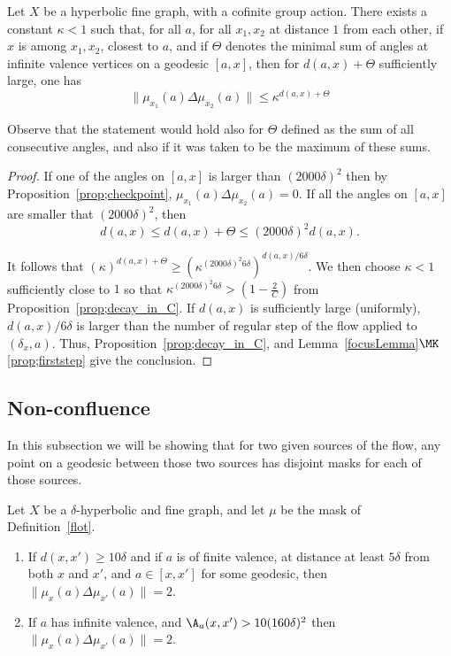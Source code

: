 \begin{prop}\label{prop;kappa}
Let $X$ be a hyperbolic fine graph, with a cofinite group
action. There exists a constant $\kappa <1$ such that, for all $a$, for all $x_1, x_2$ at distance $1$ from each other, if $x$ is among $x_1,x_2$, closest to $a$, and if $\Theta$ denotes the minimal sum of angles at infinite valence vertices on a geodesic $[a,x]$, then for $d(a,x)+\Theta $ sufficiently large, one has
\[
\| \mu_{x_1}(a) \Delta \mu_{x_2}(a) \| \leq \kappa^{d(a,x)+\Theta}
\]
\end{prop}

Observe that the statement would hold also for $\Theta$ defined as the sum of all consecutive angles, and also if it was taken to be the maximum of these sums.

\begin{proof}
If one of the angles on $[a,x]$ is larger than $(2000\delta)^2$ then by Proposition~\ref{prop;checkpoint}, $\mu_{x_1}(a) \Delta \mu_{x_2}(a) =0$. If all the angles on $[a,x]$ are smaller that $(2000\delta)^2$,
then
\[
d(a,x) \leq d(a,x)+\Theta \leq (2000\delta)^2 d(a,x).
\]

It follows that $(\kappa)^{d(a,x)+\Theta} \geq (\kappa^{(2000\delta)^2 6\delta })^{d(a,x)/6\delta}$. We then choose $\kappa<1$ sufficiently close to $1$ so that $\kappa^{(2000\delta)^2 6\delta } > (1-\frac{2}{C})$ from Proposition~\ref{prop;decay_in_C}. If $d(a,x)$ is sufficiently large (uniformly), $d(a,x)/6\delta$ is larger than the number of regular step of the flow applied to $(\delta_x, a)$. Thus, Proposition~\ref{prop;decay_in_C}, and Lemma~\ref{focusLemma}$\MK$\eqref{prop;firststep} give the conclusion.
\end{proof}

\subsection{Non-confluence}

In this subsection we will be showing that for two given sources of the flow, any point on a geodesic between those two sources has disjoint masks for each of those sources.

\begin{prop}\label{non-conf}
Let $X$ be a $\delta$-hyperbolic and fine graph, and let $\mu$ be the mask of Definition~\ref{flot}.
\begin{enumerate}
\item \label{2.12.1} If $d(x,x')\geq 10\delta$ and if $a$ is of finite valence, at distance at least $5\delta$ from both $x$ and $x'$, and $a\in [x,x']$ for some geodesic, then $\| \mu_x(a) \Delta \mu_{x'}(a) \| =2$.
\item \label{2.12.2} If $a$ has infinite valence, and $\A_a(x,x') > 10(160\delta)^2 $ then $\| \mu_x(a) \Delta \mu_{x'}(a) \| =2$.
\end{enumerate}
\end{prop}

